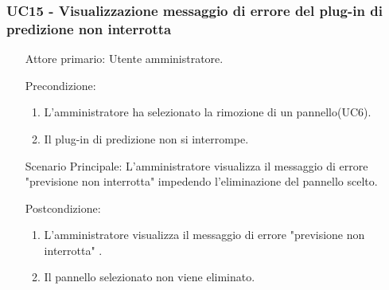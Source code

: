 \subsubsection{UC15 - Visualizzazione messaggio di errore del plug-in di predizione non interrotta}
\label{sssec:uc15}
\begin{description}
	\begin{enumerate}
		\item[Attore primario:] Utente amministratore.
		\item[Precondizione:]
		\begin{enumerate}
			\item L'amministratore ha selezionato la rimozione di un pannello(UC6).
			\item Il plug-in di predizione non si interrompe.
		\end{enumerate}
		\item[Scenario Principale:] L'amministratore visualizza il messaggio di errore "previsione non interrotta" impedendo l'eliminazione del pannello scelto.
		\item[Postcondizione:]
		\begin{enumerate}
			\item L'amministratore visualizza il messaggio di errore "previsione non interrotta" .
			\item Il pannello selezionato non viene eliminato.
		\end{enumerate}
	\end{enumerate}
\end{description}